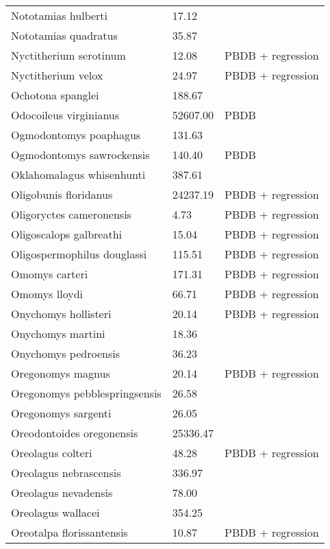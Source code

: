\documentclass{article}
\begin{document}
\begin{center}
\begin{longtable}{p{} p{} p{}}
    Nototamias hulberti & 17.12 & \cite{Tomiya2013} \\ 
    Nototamias quadratus & 35.87 & \cite{Tomiya2013} \\ 
    Nyctitherium serotinum & 12.08 & PBDB + regression \\ 
    Nyctitherium velox & 24.97 & PBDB + regression \\ 
    Ochotona spanglei & 188.67 & \cite{Tomiya2013} \\ 
    Odocoileus virginianus & 52607.00 & PBDB \\ 
    Ogmodontomys poaphagus & 131.63 & \cite{Tomiya2013} \\ 
    Ogmodontomys sawrockensis & 140.40 & PBDB \\ 
    Oklahomalagus whisenhunti & 387.61 & \cite{Tomiya2013} \\ 
    Oligobunis floridanus & 24237.19 & PBDB + regression \\ 
    Oligoryctes cameronensis & 4.73 & PBDB + regression \\ 
    Oligoscalops galbreathi & 15.04 & PBDB + regression \\ 
    Oligospermophilus douglassi & 115.51 & PBDB + regression \\ 
    Omomys carteri & 171.31 & PBDB + regression \\ 
    Omomys lloydi & 66.71 & PBDB + regression \\ 
    Onychomys hollisteri & 20.14 & PBDB + regression \\ 
    Onychomys martini & 18.36 & \cite{Tomiya2013} \\ 
    Onychomys pedroensis & 36.23 & \cite{Tomiya2013} \\ 
    Oregonomys magnus & 20.14 & PBDB + regression \\ 
    Oregonomys pebblespringsensis & 26.58 & \cite{Tomiya2013} \\ 
    Oregonomys sargenti & 26.05 & \cite{Tomiya2013} \\ 
    Oreodontoides oregonensis & 25336.47 & \cite{Tomiya2013} \\ 
    Oreolagus colteri & 48.28 & PBDB + regression \\ 
    Oreolagus nebrascensis & 336.97 & \cite{Tomiya2013} \\ 
    Oreolagus nevadensis & 78.00 & \cite{McKenna2011} \\ 
    Oreolagus wallacei & 354.25 & \cite{Tomiya2013} \\ 
    Oreotalpa florissantensis & 10.87 & PBDB + regression \\ 

\end{longtable}
\end{center}
\end{document}
